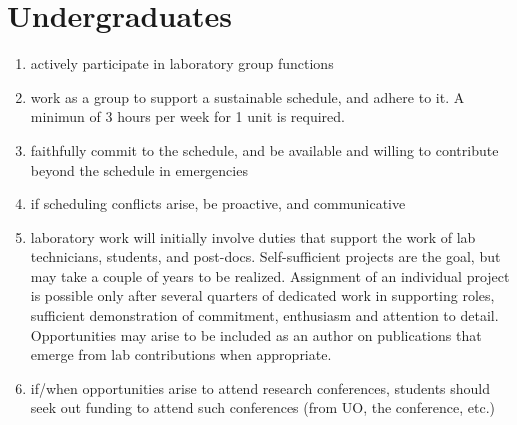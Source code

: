 \documentclass[12pt]{article}
\begin{document}
\section{Undergraduates}
\begin{enumerate}
\item actively participate in laboratory group functions
\item work as a group to support a sustainable schedule, and adhere to
  it. A minimun of 3 hours per week for 1 unit is required. 
\item faithfully commit to the schedule, and be available and willing
  to contribute beyond the schedule in emergencies
\item if scheduling conflicts arise, be proactive, and communicative
\item laboratory work will initially involve duties that support the
  work of lab technicians, students, and post-docs. Self-sufficient
  projects are the goal, but may take a couple of years to be
  realized. Assignment of an individual project is possible only after
  several quarters of dedicated work in supporting roles, sufficient
  demonstration of commitment, enthusiasm and attention to
  detail. Opportunities may arise to be included as an author on
  publications that emerge from lab contributions when appropriate.
\item if/when opportunities arise to attend research conferences, students
  should seek out funding to attend such conferences (from UO, the
  conference, etc.)
\end{enumerate}
\end{document}
